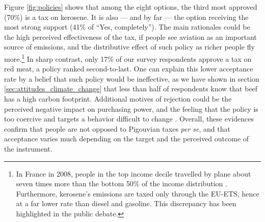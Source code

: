 \documentclass[english,5p,authoryear]{elsarticle}
\begin{document}
Figure \ref{fig:policies} shows that among the eight options, the third most approved (70\%) is a tax on kerosene. It is also --- and by far --- the option receiving the most strong support (41\% of ``Yes, completely''). The main rationales could be the high perceived effectiveness of the tax, if people see aviation as an important source of emissions, and the distributive effect of such policy as richer people fly more.\footnote{In France in 2008, people in the top income decile travelled by plane about seven times more than the bottom 50\% of the income distribution \citep{pappalardo_mobilite_2010}. Furthermore, kerosene's emissions are taxed only through the EU-ETS, hence at a far lower rate than diesel and gasoline. This discrepancy has been highlighted in the public debate.} In sharp contrast, only 17\% of our survey respondents approve a tax on red meat, a policy ranked second-to-last. One can explain this lower acceptance rate by a belief that such policy would be ineffective, as we have shown in section \ref{sec:attitudes_climate_change} that less than half of respondents know that beef has a high carbon footprint. Additional motives of rejection could be the perceived negative impact on purchasing power, and the feeling that the policy is too coercive and targets a behavior difficult to change \citep{de_groot_schuitema_2012}. Overall, these evidences confirm that people are not opposed to Pigouvian taxes \textit{per se}, and that acceptance varies much depending on the target and the perceived outcome of the instrument.

\end{document}
